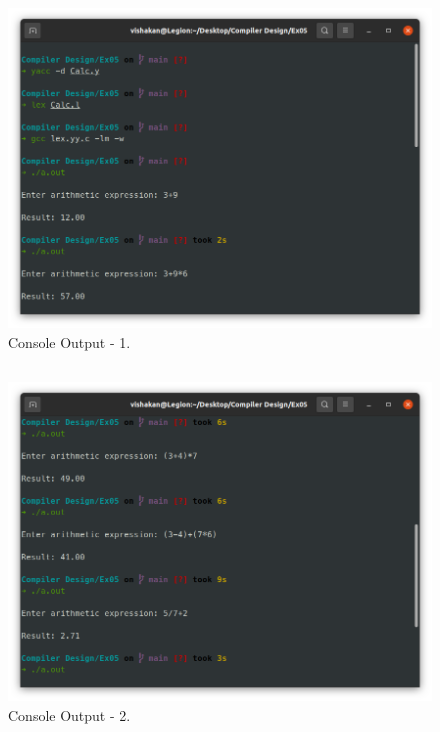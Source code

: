 \documentclass[12pt, a4]{article}
\begin{document}
\newpage
\subsection*{}
\begin{figure}[h]
\centering
\caption{Console Output - 1.}
\includegraphics[scale= 0.5]{Output1.png}
\end{figure}

\newpage
\subsection*{}
\begin{figure}[h]
\centering
\caption{Console Output - 2.}
\includegraphics[scale= 0.5]{Output2.png}
\end{figure}
\end{document}

